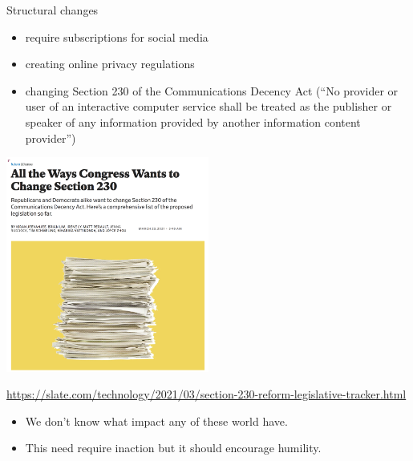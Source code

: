 \documentclass[aspectratio=169]{beamer}
\begin{document}
\begin{frame}

Structural changes
\begin{itemize}
\item require subscriptions for social media \pause
\item creating online privacy regulations \pause
\item changing Section 230 of the Communications Decency Act (``No provider or user of an interactive computer service shall be treated as the publisher or speaker of any information provided by another information content provider'')
\end{itemize}

\end{frame}
\begin{frame}

\begin{center}
\includegraphics[width=0.5\textwidth]{figures/jeevanjee_all_2021_title}
\end{center}

\vfill
\url{https://slate.com/technology/2021/03/section-230-reform-legislative-tracker.html}

\end{frame}
\begin{frame}

\begin{itemize}
\item We don't know what impact any of these world have. \pause
\item This need require inaction but it should encourage humility.
\end{itemize}
\end{frame}
\end{document}
